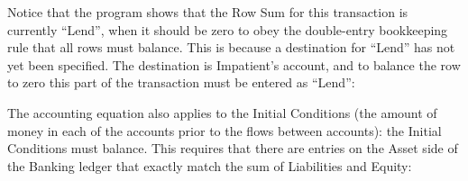 Notice that the program shows that the Row Sum for this transaction is
currently ``Lend'', when it should be zero to obey the double-entry
bookkeeping rule that all rows must balance. This is because a
destination for ``Lend'' has not yet been specified. The destination
is Impatient's account, and to balance the row to zero this part of
the transaction must be entered as ``Lend'': 

\begin{center}
\end{center}

The accounting equation also applies to the Initial Conditions (the amount of money
in each of the accounts prior to the flows between accounts): the
Initial Conditions must balance. This requires that there are
entries on the Asset side of the Banking ledger that exactly match the
sum of Liabilities and Equity: 

\begin{center}
\end{center}

